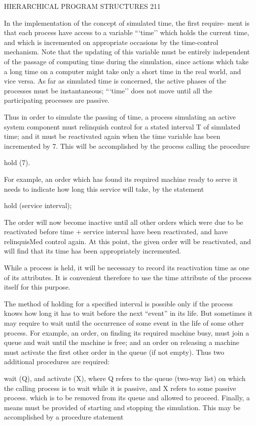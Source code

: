 {{{{{		HIERARCHICAL PROGRAM STRUCTURES 211
		
		In the implementation of the concept of simulated time, the first require- ment is that each process have access to a variable “‘time’’ which holds the current time, and which is incremented on appropriate occasions by the time-control mechanism. Note that the updating of this variable must be entirely independent of the passage of computing time during the simulation, since actions which take a long time on a computer might take only a short time in the real world, and vice versa. As far as simulated time is concerned, the active phases of the processes must be instantaneous; “‘time’’ does not move until all the participating processes are passive.
		
		Thus in order to simulate the passing of time, a process simulating an active system component must relinquish control for a stated interval T of simulated time; and it must be reactivated again when the time variable has been incremented by 7. This will be accomplished by the process calling the procedure
		
		hold (7).
		
		For example, an order which has found its required machine ready to serve it needs to indicate how long this service will take, by the statement
		
		hold (service interval);
		
		The order will now become inactive until all other orders which were due to be reactivated before time + service interval have been reactivated, and have relinquisMed control again. At this point, the given order will be reactivated, and will find that its time has been appropriately incremented.
		
		While a process is held, it will be necessary to record its reactivation time as one of its attributes. It is convenient therefore to use the time attribute of the process itself for this purpose.
		
		The method of holding for a specified interval is possible only if the process knows how long it has to wait before the next “event” in its life. But sometimes it may require to wait until the occurrence of some event in the life of some other process. For example, an order, on finding its required machine busy, must join a queue and wait until the machine is free; and an order on releasing a machine must activate the first other order in the queue (if not empty). Thus two additional procedures are required:
		
		wait (Q), and activate (X), where Q refers to the queue (two-way list) on which the calling process is to wait while it is passive, and X refers to some passive process. which is to be removed from its queue and allowed to proceed. Finally, a means must be provided of starting and stopping the simulation. This may be accomplished by a procedure statement
		
}}}}}
